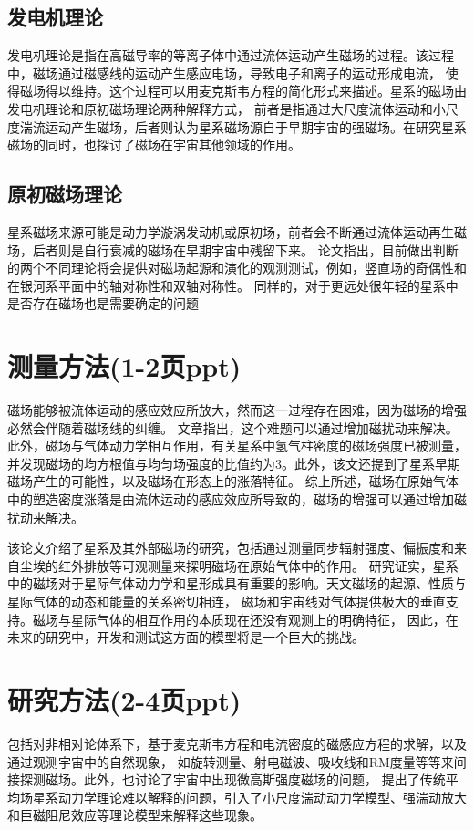 \documentclass[12pt, a4paper, oneside]{ctexart}
\begin{document}
\begin{spacing}{2.0}
\subsection{发电机理论}
发电机理论是指在高磁导率的等离子体中通过流体运动产生磁场的过程。该过程中，磁场通过磁感线的运动产生感应电场，导致电子和离子的运动形成电流，
使得磁场得以维持。这个过程可以用麦克斯韦方程的简化形式来描述。星系的磁场由发电机理论和原初磁场理论两种解释方式，
前者是指通过大尺度流体运动和小尺度湍流运动产生磁场，后者则认为星系磁场源自于早期宇宙的强磁场。在研究星系磁场的同时，也探讨了磁场在宇宙其他领域的作用。
\subsection{原初磁场理论}
星系磁场来源可能是动力学漩涡发动机或原初场，前者会不断通过流体运动再生磁场，后者则是自行衰减的磁场在早期宇宙中残留下来。
论文指出，目前做出判断的两个不同理论将会提供对磁场起源和演化的观测测试，例如，竖直场的奇偶性和在银河系平面中的轴对称性和双轴对称性。
同样的，对于更远处很年轻的星系中是否存在磁场也是需要确定的问题
\section{测量方法(1-2页ppt)}
磁场能够被流体运动的感应效应所放大，然而这一过程存在困难，因为磁场的增强必然会伴随着磁场线的纠缠。
文章指出，这个难题可以通过增加磁扰动来解决。此外，磁场与气体动力学相互作用，有关星系中氢气柱密度的磁场强度已被测量，
并发现磁场的均方根值与均匀场强度的比值约为3。此外，该文还提到了星系早期磁场产生的可能性，以及磁场在形态上的涨落特征。
综上所述，磁场在原始气体中的塑造密度涨落是由流体运动的感应效应所导致的，磁场的增强可以通过增加磁扰动来解决。

该论文介绍了星系及其外部磁场的研究，包括通过测量同步辐射强度、偏振度和来自尘埃的红外排放等可观测量来探明磁场在原始气体中的作用。
研究证实，星系中的磁场对于星际气体动力学和星形成具有重要的影响。天文磁场的起源、性质与星际气体的动态和能量的关系密切相连，
磁场和宇宙线对气体提供极大的垂直支持。磁场与星际气体的相互作用的本质现在还没有观测上的明确特征，
因此，在未来的研究中，开发和测试这方面的模型将是一个巨大的挑战。

\section{研究方法(2-4页ppt)}
包括对非相对论体系下，基于麦克斯韦方程和电流密度的磁感应方程的求解，以及通过观测宇宙中的自然现象，
如旋转测量、射电磁波、吸收线和RM度量等等来间接探测磁场。此外，也讨论了宇宙中出现微高斯强度磁场的问题，
提出了传统平均场星系动力学理论难以解释的问题，引入了小尺度湍动动力学模型、强湍动放大和巨磁阻尼效应等理论模型来解释这些现象。

\end{spacing}
\end{document}
